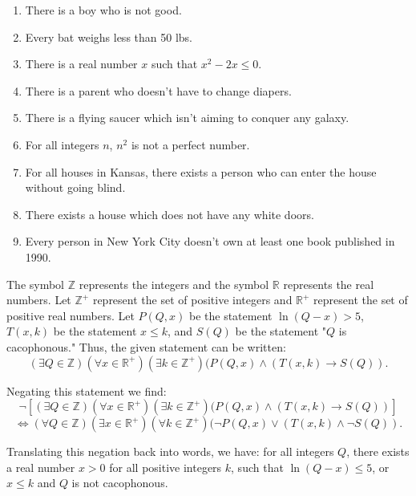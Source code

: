 \documentclass{article}
\theoremstyle{definition}
\newcommand{\R}{\mathbb{R}}
\newcommand{\Z}{\mathbb{Z}}
\begin{document}
	\begin{enumerate}
		\item There is a boy who is not good.
		\item Every bat weighs less than 50 lbs.
		\item There is a real number $x$ such that $x^2-2x\le0$.
		\item There is a parent who doesn't have to change diapers.
		\item There is a flying saucer which isn't aiming to conquer any
		galaxy.
		\item For all integers $n$, $n^2$ is not a perfect number.
		\item For all houses in Kansas, there exists a person who can enter
		the house without going blind.
		\item There exists a house which does not have any white doors.
		\item Every person in New York City doesn't own at least one book
		published in 1990.
	\end{enumerate}

	\vspace{0.6cm}

	\noindent {}\vspace{0.2cm}

	The symbol $\Z$ represents the integers and the symbol $\R$
	represents the real numbers. Let $\Z^+$ represent the set of
	positive integers and $\R^+$ represent the set of positive real
	numbers. Let $P(Q,x)$ be the statement $\ln(Q-x)>5$, $T(x,k)$ be
	the statement $x\le k$, and $S(Q)$ be the statement "$Q$ is
	cacophonous."  Thus, the given statement can be written:
	$$(\exists Q \in \Z)(\forall x \in \R^+)(\exists k
	\in
	\Z^+)(P(Q,x)\wedge(T(x,k)\rightarrow S(Q)).$$

	Negating this statement we find:
	$$\neg[(\exists Q \in \Z)(\forall x \in \R^+)(\exists k \in
	\Z^+)(P(Q,x)\wedge(T(x,k)\rightarrow S(Q))]$$$$\Leftrightarrow (\forall
	Q \in \Z)(\exists x \in \R^+)(\forall k \in \Z^+)(\neg
	P(Q,x)\vee(T(x,k)\wedge\neg S(Q)).$$

	Translating this negation back into words, we have: for all integers
	$Q$, there exists a real number $x>0$ for all positive integers $k$,
	such that $\ln(Q-x)\le 5$, or $x\le k$ and $Q$ is not cacophonous.

	\vspace{0.6cm}

	\noindent {}\vspace{0.2cm}
\end{document}
